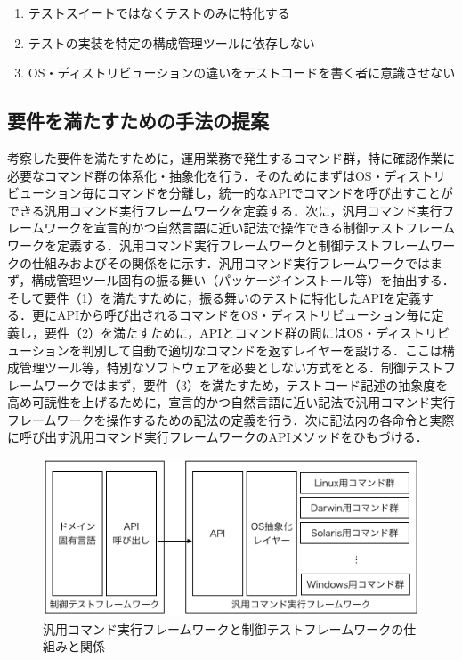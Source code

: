 \begin{enumerate}
  \item テストスイートではなくテストのみに特化する
  \item テストの実装を特定の構成管理ツールに依存しない
  \item OS・ディストリビューションの違いをテストコードを書く者に意識させない
\end{enumerate}

\subsection{要件を満たすための手法の提案}

考察した要件を満たすために，運用業務で発生するコマンド群，特に確認作業に必要なコマンド群の体系化・抽象化を行う．そのためにまずはOS・ディストリビューション毎にコマンドを分離し，統一的なAPIでコマンドを呼び出すことができる汎用コマンド実行フレームワークを定義する．次に，汎用コマンド実行フレームワークを宣言的かつ自然言語に近い記法で操作できる制御テストフレームワークを定義する．汎用コマンド実行フレームワークと制御テストフレームワークの仕組みおよびその関係をに示す．汎用コマンド実行フレームワークではまず，構成管理ツール固有の振る舞い（パッケージインストール等）を抽出する．そして要件（1）を満たすために，振る舞いのテストに特化したAPIを定義する．更にAPIから呼び出されるコマンドをOS・ディストリビューション毎に定義し，要件（2）を満たすために，APIとコマンド群の間にはOS・ディストリビューションを判別して自動で適切なコマンドを返すレイヤーを設ける．ここは構成管理ツール等，特別なソフトウェアを必要としない方式をとる．制御テストフレームワークではまず，要件（3）を満たすため，テストコード記述の抽象度を高め可読性を上げるために，宣言的かつ自然言語に近い記法で汎用コマンド実行フレームワークを操作するための記法の定義を行う．次に記法内の各命令と実際に呼び出す汎用コマンド実行フレームワークのAPIメソッドをひもづける．



\begin{figure}[tb]
  \includegraphics{framework-overview.png}
  \caption{汎用コマンド実行フレームワークと制御テストフレームワークの仕組みと関係}
  \label{fig:framework}
\end{figure}

